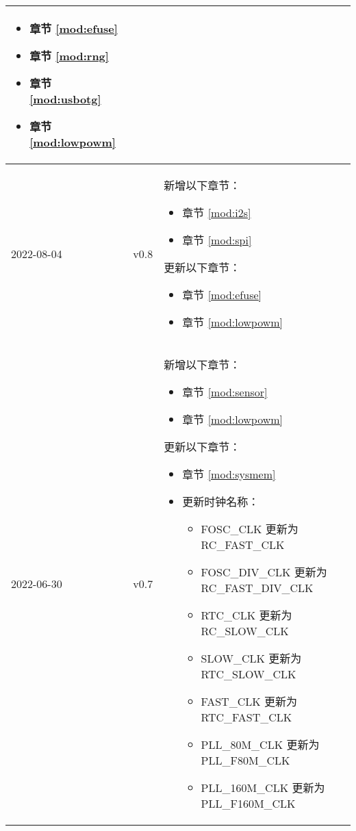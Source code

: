 \begin{longtable}[l]{ | m{2cm} | m{1.5cm} | m{12cm} | }
\begin{itemize}
        \item 章节 \ref{mod:efuse} \textit{\nameref{mod:efuse}}
        \item 章节 \ref{mod:rng} \textit{\nameref{mod:rng}}
        \item 章节 \ref{mod:usbotg} \textit{\nameref{mod:usbotg}}
        \item 章节 \ref{mod:lowpowm} \textit{\nameref{mod:lowpowm}}
    \end{itemize}
    \\\hline
    2022-08-04     & v0.8  &
    新增以下章节：
    \begin{itemize}
        \item 章节 \ref{mod:i2s} \textit{\nameref{mod:i2s}}
        \item 章节 \ref{mod:spi} \textit{\nameref{mod:spi}}
    \end{itemize}
    更新以下章节：
    \begin{itemize}
        \item 章节 \ref{mod:efuse} \textit{\nameref{mod:efuse}} %
        \item 章节 \ref{mod:lowpowm} \textit{\nameref{mod:lowpowm}} %
    \end{itemize}
    \\\hline
    2022-06-30     & v0.7  &
    新增以下章节：
    \begin{itemize}
        \item 章节 \ref{mod:sensor} \textit{\nameref{mod:sensor}}
        \item 章节 \ref{mod:lowpowm} \textit{\nameref{mod:lowpowm}}
    \end{itemize}
    更新以下章节：
    \begin{itemize}
        \item 章节 \ref{mod:sysmem} \textit{\nameref{mod:sysmem}}
        \item 更新时钟名称：
        \begin{itemize}
        \item FOSC\_CLK 更新为 RC\_FAST\_CLK
        \item FOSC\_DIV\_CLK 更新为 RC\_FAST\_DIV\_CLK
        \item RTC\_CLK 更新为 RC\_SLOW\_CLK
        \item SLOW\_CLK 更新为 RTC\_SLOW\_CLK
        \item FAST\_CLK 更新为 RTC\_FAST\_CLK
        \item PLL\_80M\_CLK 更新为 PLL\_F80M\_CLK
        \item PLL\_160M\_CLK 更新为 PLL\_F160M\_CLK

\end{itemize}
\end{itemize}
\end{longtable}
